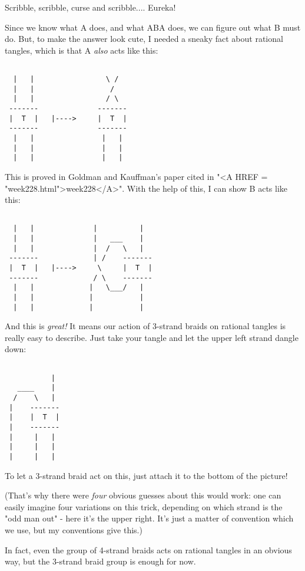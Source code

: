 Scribble, scribble, curse and scribble.... Eureka!

Since we know what A does, and what ABA does, we can figure out 
what B must do.  But, to make the answer look cute, I needed a 
sneaky fact about rational tangles, which is that A \emph{also} acts 
like this:


\begin{verbatim}

  |   |                 \ / 
  |   |                  /
  |   |                 / \ 
 -------              -------
 |  T  |   |---->     |  T  |        
 -------              -------
  |   |                |   |
  |   |                |   | 
  |   |                |   |
\end{verbatim}
    
This is proved in Goldman and Kauffman's paper cited in "<A HREF = "week228.html">week228</A>".
With the help of this, I can show B acts like this:


\begin{verbatim}

  |   |              |          |
  |   |              |   ___    |
  |   |              |  /   \   |
 -------             | /    -------   
 |  T  |   |---->     \     |  T  |  
 -------             / \    ------- 
  |   |             |   \___/   | 
  |   |             |           | 
  |   |             |           |
\end{verbatim}
    
And this is \emph{great!}  It means our action of 3-strand braids on 
rational tangles is really easy to describe.  Just take your tangle
and let the upper left strand dangle down:


\begin{verbatim}

           |
   ____    |               
  /    \   |              
 |    -------           
 |    |  T  |   
 |    -------  
 |     |   |  
 |     |   | 
 |     |   |
\end{verbatim}
    
To let a 3-strand braid act on this, just attach it to the bottom of
the picture!   

(That's why there were \emph{four} obvious guesses about this would work:
one can easily imagine four variations on this trick, depending on 
which strand is the "odd man out" - here it's the upper right.  It's
just a matter of convention which we use, but my conventions give this.)

In fact, even the group of 4-strand braids acts on rational tangles in 
an obvious way, but the 3-strand braid group is enough for now.

